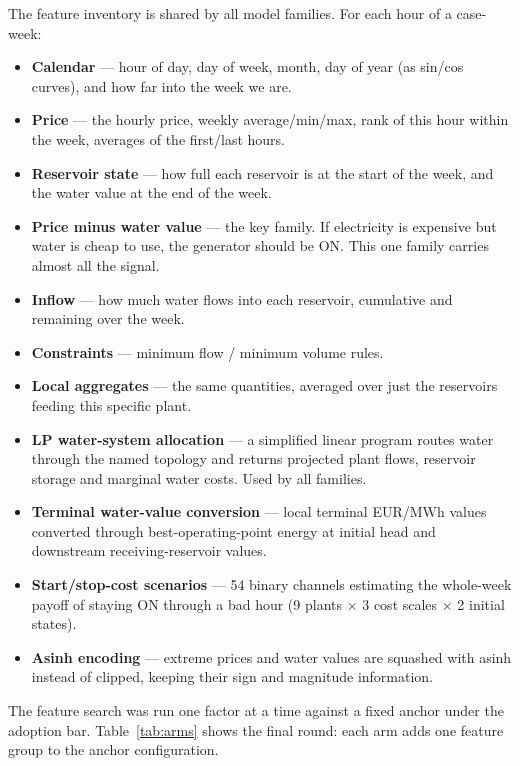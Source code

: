 \documentclass{article}
\begin{document}
The feature inventory is shared by all model families. For each hour of
a case-week:
\begin{itemize}
    \item \textbf{Calendar} — hour of day, day of week, month, day of
    year (as sin/cos curves), and how far into the week we are.
    \item \textbf{Price} — the hourly price, weekly average/min/max,
    rank of this hour within the week, averages of the first/last hours.
    \item \textbf{Reservoir state} — how full each reservoir is at the
    start of the week, and the water value at the end of the week.
    \item \textbf{Price minus water value} — the key family. If
    electricity is expensive but water is cheap to use, the generator
    should be ON. This one family carries almost all the signal.
    \item \textbf{Inflow} — how much water flows into each reservoir,
    cumulative and remaining over the week.
    \item \textbf{Constraints} — minimum flow / minimum volume rules.
    \item \textbf{Local aggregates} — the same quantities, averaged over
    just the reservoirs feeding this specific plant.
    \item \textbf{LP water-system allocation} — a simplified linear
    program routes water through the named topology and returns
    projected plant flows, reservoir storage and marginal water costs.
    Used by all families.
    \item \textbf{Terminal water-value conversion} — local terminal
    EUR/MWh values converted through best-operating-point energy at
    initial head and downstream receiving-reservoir values.
    \item \textbf{Start/stop-cost scenarios} — 54 binary channels
    estimating the whole-week payoff of staying ON through a bad hour
    (9 plants $\times$ 3 cost scales $\times$ 2 initial states).
    \item \textbf{Asinh encoding} — extreme prices and water values are
    squashed with asinh instead of clipped, keeping their sign and
    magnitude information.
\end{itemize}

The feature search was run one factor at a time against a fixed anchor
under the adoption bar. Table~\ref{tab:arms} shows the final round: each
arm adds one feature group to the anchor configuration.
\end{document}

